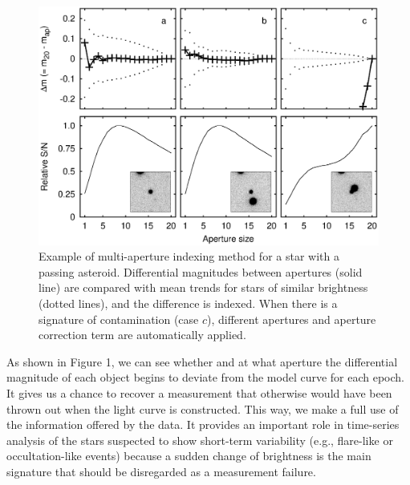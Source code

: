 \begin{figure}[!ht]
\begin{center}
\includegraphics[scale=0.45]{part2/Chang_O07/O07_f1.eps}
\caption{Example of multi-aperture indexing method for a star with a passing asteroid.  Differential magnitudes between apertures (solid line) are compared with mean trends for stars of similar brightness (dotted lines), and the difference is indexed.  When there is a signature of contamination (case $c$), different apertures and aperture correction term are automatically applied.}
\end{center}
\label{Fig1}
\end{figure}

\noindent As shown in Figure 1, we can see whether and at what aperture the differential magnitude of each object begins to deviate from the model curve for each epoch.  It gives us a chance to recover a measurement that otherwise would have been thrown out when the light curve is constructed.  This way, we make a full use of the information offered by the data.  It provides an important role in time-series analysis of the stars suspected to show short-term variability (e.g., flare-like or occultation-like events) because a sudden change of brightness is the main signature that should be disregarded as a measurement failure.  

